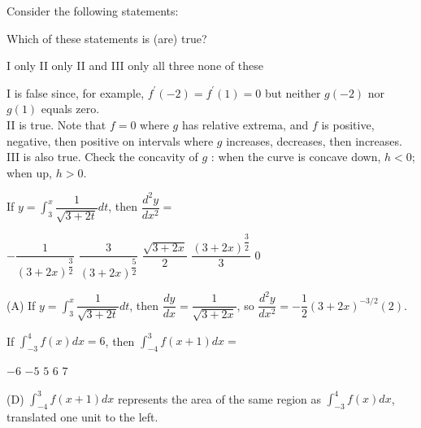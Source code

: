 Consider the following statements:


Which of these statements is (are) true?
\begin{choices}
  \choice I only
  \choice II only
  \CorrectChoice II and III only
  \choice all three
  \choice none of these
\end{choices}
\begin{solution}
I is false since, for example, $f^{\prime}(-2)=f^{\prime}(1)=0$ but neither $g(-2)$ nor $g(1)$ equals zero.\\
II is true. Note that $f=0$ where $g$ has relative extrema, and $f$ is positive, negative, then positive on intervals where $g$ increases, decreases, then increases.\\
III is also true. Check the concavity of $g$ : when the curve is concave down, $h<0$; when up, $h>0$.
\end{solution}


\newpage





\question
If $y=\displaystyle\int_{3}^{x} \dfrac{1}{\sqrt{3+2 t}} d t$, then $\dfrac{d^{2} y}{d x^{2}}=$
\begin{choices}
  \CorrectChoice $-\dfrac{1}{(3+2 x)^{\dfrac{3}{2}}}$
  \choice $\dfrac{3}{(3+2 x)^{\dfrac{5}{2}}}$
  \choice $\dfrac{\sqrt{3+2 x}}{2}$
  \choice $\dfrac{(3+2 x)^{\dfrac{3}{2}}}{3}$
  \choice $0$
\end{choices}
\begin{solution}
(A) If $y=\displaystyle\int_{3}^{x} \dfrac{1}{\sqrt{3+2 t}} d t$, then $\dfrac{d y}{d x}=\dfrac{1}{\sqrt{3+2 x}}$, so $\dfrac{d^{2} y}{d x^{2}}=-\dfrac{1}{2}(3+2 x)^{-3 / 2}(2)$.
\end{solution}

\question
If $\displaystyle\int_{-3}^{4} f(x) d x=6$, then $\displaystyle\int_{-4}^{3} f(x+1) d x=$
\begin{choices}
  \choice $-6$
  \choice $-5$
  \choice $5$
  \CorrectChoice $6$
  \choice $7$
\end{choices}
\begin{solution}
(D) $\displaystyle\int_{-4}^{3} f(x+1) d x$ represents the area of the same region as $\displaystyle\int_{-3}^{4} f(x) d x$, translated one unit to the left.
\end{solution}

